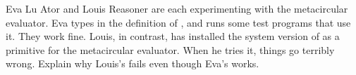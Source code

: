 \begin{exercise}
	\label{Exercise 4.14}
	Eva Lu Ator and Louis Reasoner are each experimenting with the metacircular evaluator.
	Eva types in the definition of , and runs some test programs that use it.
	They work fine.
	Louis, in contrast, has installed the system version of  as a primitive for the metacircular evaluator.
	When he tries it, things go terribly wrong.
	Explain why Louis’s  fails even though Eva’s works.
\end{exercise}
